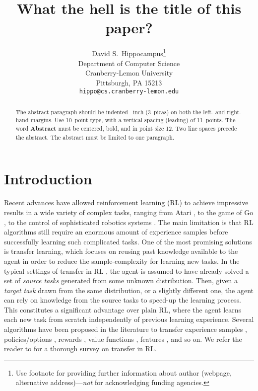 \documentclass{article}
\title{What the hell is the title of this paper?}
\author{
  David S.~Hippocampus\thanks{Use footnote for providing further
    information about author (webpage, alternative
    address)---\emph{not} for acknowledging funding agencies.} \\
  Department of Computer Science\\
  Cranberry-Lemon University\\
  Pittsburgh, PA 15213 \\
  \texttt{hippo@cs.cranberry-lemon.edu} \\
}
\begin{document}

\maketitle

\begin{abstract}
  The abstract paragraph should be indented ~inch
  (3~picas) on both the left- and right-hand margins. Use 10~point
  type, with a vertical spacing (leading) of 11~points.  The word
  \textbf{Abstract} must be centered, bold, and in point size 12. Two
  line spaces precede the abstract. The abstract must be limited to
  one paragraph.
\end{abstract}

\section{Introduction}

Recent advances have allowed reinforcement learning (RL) \cite{} to achieve impressive results in a wide variety of complex tasks, ranging from Atari \cite{}, to the game of Go \cite{}, to the control of sophisticated robotics systems \cite{}. The main limitation is that RL algorithms still require an enormous amount of experience samples before successfully learning such complicated tasks. One of the most promising solutions is transfer learning, which focuses on reusing past knowledge available to the agent in order to reduce the sample-complexity for learning new tasks. In the typical settings of transfer in RL \cite{}, the agent is assumed to have already solved a set of \textit{source tasks} generated from some unknown distribution. Then, given a \textit{target task} drawn from the same distribution, or a slightly different one, the agent can rely on knowledge from the source tasks to speed-up the learning process. This constitutes a significant advantage over plain RL, where the agent learns each new task from scratch independently of previous learning experience. Several algorithms have been proposed in the literature to transfer experience samples \cite{}, policies/options \cite{}, rewards \cite{}, value functions \cite{}, features \cite{}, and so on. We refer the reader to \cite{} for a thorough survey on transfer in RL.
\end{document}
